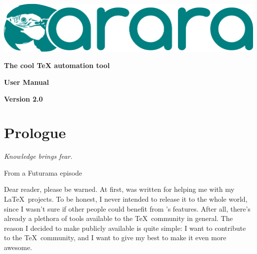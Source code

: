 \documentclass[a4paper,twoside,12pt]{memoir}
\newcommand{\araraversion}{2.0}
\begin{document}
\begin{titlingpage}

\begin{center}
\vspace*{3em}

\includegraphics[scale=.7]{araralogo.pdf}

\vspace{2em}

{\color{araracolor}\bfseries\Huge The cool \TeX{} automation tool}

\vspace{15em}

\begin{mdframed}[innertopmargin=10pt,innerbottommargin=10pt,innerleftmargin=10pt,%
                innerrightmargin=10pt,roundcorner=5pt,linecolor=araracolor,%
                middlelinewidth=2pt]
{\color{araracolor}\bfseries\Huge\Forward\hfill User Manual}
\end{mdframed}

\vfill

{\color{araracolor}\bfseries\LARGE Version \araraversion}

\end{center}

\end{titlingpage}

\frontmatter
{}
\pagestyle{araraheadings}

\chapter*{Prologue}
\label{chap:prologue}

\epigraph{\emph{Knowledge brings fear.}}{From a Futurama episode}

Dear reader, please be warned. At first, \arara was written for helping me with
my \LaTeX\ projects. To be honest, I never intended to release it to the whole 
world, since I wasn't sure if other people could benefit from \arara's features.
After all, there's already a plethora of tools available to the \TeX\ community 
in general. The reason I decided to make \arara publicly available is quite 
simple: I want to contribute to the \TeX\ community, and I want to give my best 
to make it even more awesome.
\end{document}
